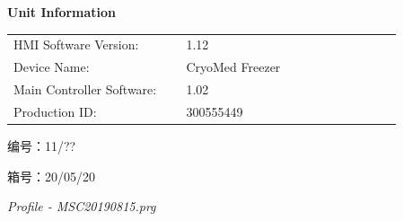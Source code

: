 \documentclass[UTF8,10pt,a4paper,fontset=fandol]{ctexart}
\newcommand{\fieldvalue}[1]{#1}
\newcommand{\handwritten}[1]{#1}
\begin{document}
\medskip
\textbf{Unit Information}

\begin{tabular}{@{}p{0.40\linewidth}p{0.50\linewidth}@{}}
HMI Software Version: &
\fieldvalue{1.12} \\[2pt]
Device Name: &
\fieldvalue{CryoMed Freezer} \\[2pt]
Main Controller Software: &
\fieldvalue{1.02} \\[2pt]
Production ID: &
\fieldvalue{300555449}
\end{tabular}

\handwritten{编号：11/??}

\handwritten{箱号：20/05/20}

\medskip

\begin{center}
\end{center}

\begin{center}
\textit{Profile - MSC20190815.prg}
\end{center}

\medskip
\end{document}
